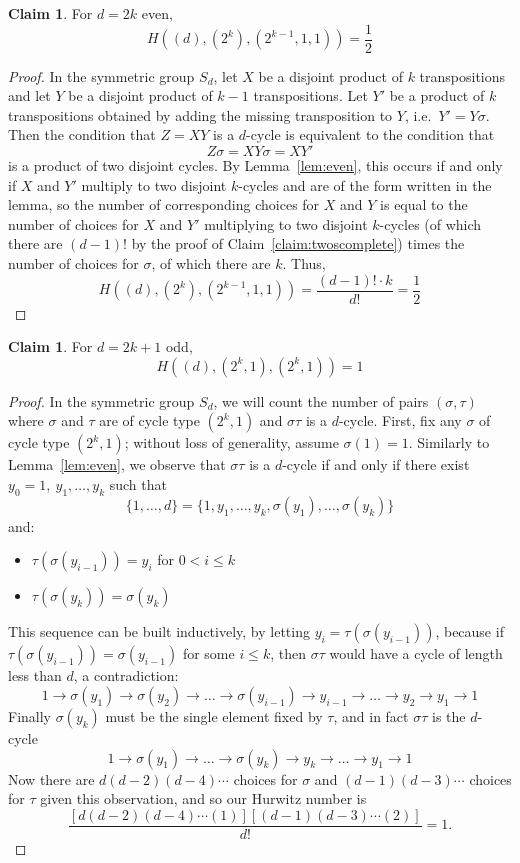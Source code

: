 \documentclass[thesis]{thesis-umich}           %
\theoremstyle{definition}
\newtheorem{claim}[thm]{Claim}
\begin{document}
\begin{claim}
  \label{claim:twoseven}
For $d=2k$ even,
\[
H((d),(2^k),(2^{k-1},1,1))=\frac 12
\]
\end{claim}
\begin{proof}
  In the symmetric group $S_d$, let $X$ be a disjoint product of $k$ transpositions
  and let $Y$ be a disjoint product of $k-1$ transpositions. Let $Y'$ be a product
  of $k$ transpositions obtained by adding the missing transposition to $Y$, i.e.\ $Y'=Y\sigma$.
  Then the condition that $Z=XY$ is a $d$-cycle is equivalent to the condition that
  \[
  Z\sigma=XY\sigma=XY'
  \]
  is a product of two disjoint cycles. By Lemma~\ref{lem:even},
  this occurs if and only if $X$ and $Y'$ multiply to two disjoint $k$-cycles and are of
  the form written in the lemma, so the number of corresponding choices
  for $X$ and $Y$ is equal to the number of choices for $X$ and $Y'$ multiplying
  to two disjoint $k$-cycles (of which there are $(d-1)!$ by the proof of Claim~\ref{claim:twoscomplete}) times the number
  of choices for $\sigma$, of which there are $k$. Thus,
  \[
  H((d),(2^k),(2^{k-1},1,1))=\frac{(d-1)!\cdot k}{d!}=\frac 12
  \]
  
  \end{proof}

\begin{claim}
  \label{claim:twosodd}
For $d=2k+1$ odd,
\[
H((d),(2^k,1),(2^k,1))=1
\]
\end{claim}
\begin{proof}
  In the symmetric group $S_d$, we will count the number of pairs $(\sigma,\tau)$ where
  $\sigma$ and $\tau$ are of cycle type $(2^k,1)$ and $\sigma\tau$ is a $d$-cycle.
  First, fix any $\sigma$ of cycle type $(2^k,1)$; without loss of generality,
  assume $\sigma(1)=1$. Similarly
  to Lemma~\ref{lem:even}, we observe that $\sigma\tau$ is a $d$-cycle if
  and only if there exist $y_0=1,\ y_1,\dots,y_k$ such that
  \[
  \{1,\dots,d\}=\{1,y_1,\dots,y_k,\sigma(y_1),\dots,\sigma(y_k)\}
  \]
  and:
  \begin{itemize}
  \item $\tau(\sigma(y_{i-1}))=y_{i}$ for $0<i\leq k$
    \item $\tau(\sigma(y_k))=\sigma(y_k)$
  \end{itemize}
  This sequence can be built inductively,
  by letting $y_i=\tau(\sigma(y_{i-1}))$, because
  if $\tau(\sigma(y_{i-1}))=\sigma(y_{i-1})$ for some
  $i\leq k$, then
  $\sigma\tau$ would have a cycle of length less than $d$,
  a contradiction:
  \[
  1\to \sigma(y_1)\to \sigma(y_2)\to\dots\to\sigma(y_{i-1})\to y_{i-1}\to
  \dots\to y_2\to y_1\to 1
  \]
  Finally $\sigma(y_k)$ must be the single element fixed by
  $\tau$, and in fact $\sigma\tau$ is the $d$-cycle
  \[
  1\to \sigma(y_1)\to\dots\to \sigma(y_k)\to y_k\to\dots\to y_1\to 1
  \]
  Now there are $d(d-2)(d-4)\cdots$ choices for $\sigma$
  and $(d-1)(d-3)\cdots$ choices for $\tau$ given this observation,
  and so our Hurwitz number is
  \[
  \frac{[d(d-2)(d-4)\cdots(1)][(d-1)(d-3)\cdots(2)]}{d!}=1.
  \]
  
  

  \end{proof}
\end{document}
